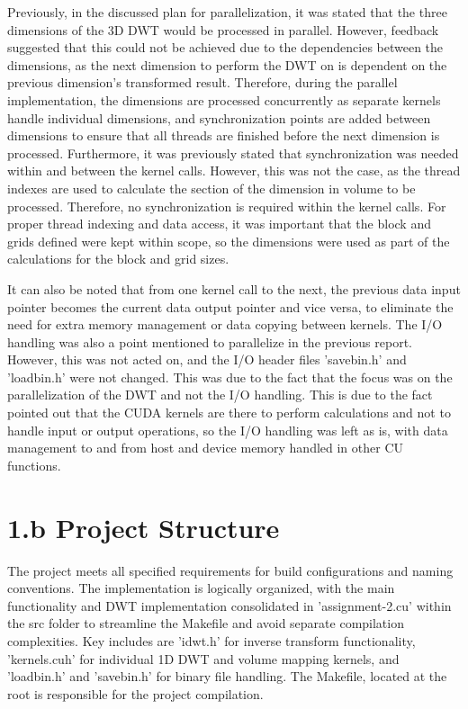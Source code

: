 \documentclass[journal,11pt]{IEEEtran}
\begin{document}
Previously, in the discussed plan for parallelization, it was stated that the three dimensions of the 3D DWT would be processed in parallel. However, feedback suggested that this could not be achieved due to the dependencies between the dimensions, as the next dimension to perform the DWT on is dependent on the previous dimension's transformed result. Therefore, during the parallel implementation, the dimensions are processed concurrently as separate kernels handle individual dimensions, and synchronization points are added between dimensions to ensure that all threads are finished before the next dimension is processed. Furthermore, it was previously stated that synchronization was needed within and between the kernel calls. However, this was not the case, as the thread indexes are used to calculate the section of the dimension in volume to be processed. Therefore, no synchronization is required within the kernel calls. For proper thread indexing and data access, it was important that the block and grids defined were kept within scope, so the dimensions were used as part of the calculations for the block and grid sizes.

It can also be noted that from one kernel call to the next, the previous data input pointer becomes the current data output pointer and vice versa, to eliminate the need for extra memory management or data copying between kernels. The I/O handling was also a point mentioned to parallelize in the previous report. However, this was not acted on, and the I/O header files 'savebin.h' and 'loadbin.h' were not changed. This was due to the fact that the focus was on the parallelization of the DWT and not the I/O handling. This is due to the fact pointed out that the CUDA kernels are there to perform calculations and not to handle input or output operations, so the I/O handling was left as is, with data management to and from host and device memory handled in other CU functions.

\section{1.b Project Structure}
The project meets all specified requirements for build configurations and naming conventions. The implementation is logically organized, with the main functionality and DWT implementation consolidated in 'assignment-2.cu' within the src folder to streamline the Makefile and avoid separate compilation complexities. Key includes are 'idwt.h' for inverse transform functionality, 'kernels.cuh' for individual 1D DWT and volume mapping kernels, and 'loadbin.h' and 'savebin.h' for binary file handling. The Makefile, located at the root is responsible for the project compilation.
\end{document}
